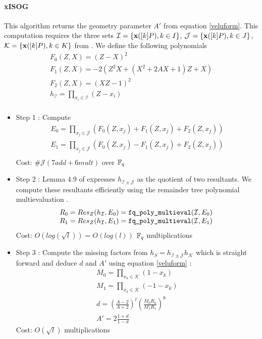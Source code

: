 \documentclass[../main.tex]{subfilesubs}
\begin{document}
\paragraph{xISOG} This algorithm returns the geometry parameter $A'$ from equation \eqref{veluform}. This computation requires the three sets $\mathcal{I}=\{\textbf{x}([k]P), k\in I\}$, $\mathcal{J}=\{\textbf{x}([k]P), k\in J\}$, $\mathcal{K}=\{\textbf{x}([k]P), k\in K\}$ from .
We define the following polynomials \[\begin{array}{l}
	F_0(Z,X)=(Z-X)^2\\
	F_1(Z,X)=-2(Z^2X+(X^2+2AX+1)Z+X)\\
	F_2(Z,X)=(XZ-1)^2\\
	h_\mathcal{I}=\prod_{x_i\in\mathcal{I}}(Z-x_i)\\
\end{array}\]
\begin{itemize}
\item Step 1 : Compute \[\begin{array}{l}
	E_0 = \prod_{x_j\in\mathcal{J}}(F_0(Z,x_j)+F_1(Z,x_j)+F_2(Z,x_j))\\
	E_1 = \prod_{x_j\in\mathcal{J}}(F_0(Z,x_j)-F_1(Z,x_j)+F_2(Z,x_j))\\
\end{array}\]
Cost: $\#\mathcal{J}(7add+6mult)$ over $\mathbb{F}_q$
\item Step 2 : Lemma 4.9 of \cite{} expresses $h_{\mathcal{I}\pm \mathcal{J}}$ as the quotient of two resultants. We compute these resultants efficiently using the remainder tree polynomial multievaluation .
\[\begin{array}{l}
	R_0 = Res_Z(h_\mathcal{I},E_0) = \funct{fq_poly_multieval}(\mathcal{I}, E_0)\\
	R_1 = Res_Z(h_\mathcal{I},E_1) = \funct{fq_poly_multieval}(\mathcal{I}, E_1)\
\end{array}\]
Cost: $O(log(\sqrt{l}))=O(log(l))$ $\mathbb{F}_q$ multiplications
\item Step 3 : Compute the missing factors from $h_S=h_{\mathcal{I}\pm \mathcal{J}}h_\mathcal{K}$ which is straight forward and deduce $d$ and $A'$ using equation \eqref{veluform} :
 \[\begin{array}{l}
	M_0 = \prod_{x_k\in\mathcal{K}}(1-x_k)\\
	M_1 = \prod_{x_k\in\mathcal{K}}(-1-x_k)\\
	d = \left(\frac{A-2}{A+2}\right)^l \left( \frac{M_0R_0}{M_1R_1}\right)^8\\
	A'=2\frac{1+d}{1-d}
 \end{array}\]
Cost: $O(\sqrt{l})$ multiplications
\end{itemize}
\end{document}
